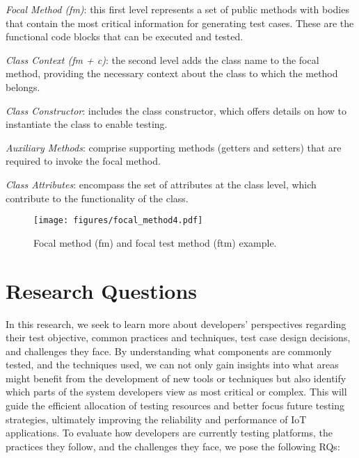 \textit{Focal Method (fm)}: this first level represents a set of public methods with bodies that contain the most critical information for generating test cases. These are the functional code blocks that can be executed and tested.

\textit{Class Context (fm + c)}: the second level adds the class name to the focal method, providing the necessary context about the class to which the method belongs.

\textit{Class Constructor}: includes the class constructor, which offers details on how to instantiate the class to enable testing.

\textit{Auxiliary Methods}:  comprise supporting methods (\eg getters and setters) that are required to invoke the focal method.

\textit{Class Attributes}: encompass the set of attributes at the class level, which contribute to the functionality of the class.



\begin{figure}[t]
  \centering
  \texttt{[image: figures/focal\_method4.pdf]}
  
  \caption{Focal method (fm) and focal test method (ftm) example.}
  \label{fig:focalmethods}
\end{figure}

\section{Research Questions}
\label{sec:rq}

In this research, we seek to learn more about \iot developers' perspectives regarding their test objective, common practices and techniques, test case design decisions, and challenges they face. By understanding what components are commonly tested, and the techniques used, we can not only gain insights into what areas might benefit from the development of new tools or techniques but also identify which parts of the system developers view as most critical or complex. This will guide the efficient allocation of testing resources and better focus future testing strategies, ultimately improving the reliability and performance of IoT applications. To evaluate how developers are currently testing \iot platforms, the practices they follow, and the challenges they face, we pose the following RQs:

